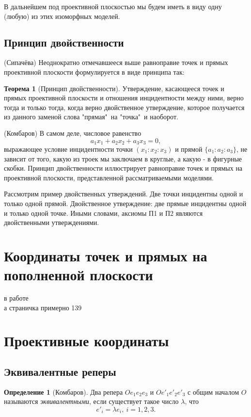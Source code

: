 \documentclass[a4paper, 12pt]{article}
\theoremstyle{definition}
\newtheorem*{definition}{Определение}
\newtheorem*{theorem}{Теорема}
\begin{document}
В дальнейшем под проективной плоскостью мы будем иметь в виду одну (любую) из этих изоморфных моделей.


\subsection{Принцип двойственности}
(Сипачёва) Неоднократно отмечавшееся выше равноправие точек и прямых проективной плоскости формулируется в виде принципа так:

\begin{theorem}[Принцип двойственности]
    Утверждение, касающееся точек и прямых проективной плоскости и отношения инцидентности между ними, верно тогда и только тогда, когда верно двойственное утверждение, которое получается из данного заменой слова "прямая"\ на "точка"\ и наоборот.
\end{theorem}

(Комбаров) В самом деле, числовое равенство \[ a_1x_1 + a_2x_2 + a_3x_3 = 0, \] выражающее условие инцидентности точки $(x_1:x_2:x_3)$ и прямой $\{a_1:a_2:a_3\}$, не зависит от того, какую из троек мы заключаем в круглые, а какую - в фигурные скобки. Принцип двойственности иллюстрирует равноправие точек и прямых на проективной плоскости, представленной рассматриваемыми моделями.

Рассмотрим пример двойственных утверждений. Две точки инцидентны одной и только одной прямой. Двойственное утверждение: две прямые инцидентны одной и только одной точке. Иными словами, аксиомы П1 и П2 являются двойственными утверждениями.

\section{Координаты точек и прямых на пополненной плоскости}
в работе\\
а страничка примерно 139

\section{Проективные координаты}
\subsection{Эквивалентные реперы}
\begin{definition}[Комбаров]
    Два репера $Oe_1e_2e_3$ и $Oe'_1e'_2e'_3$ с общим началом $O$ называются \textit{эквивалентными}, если существует такое число $\lambda$, что \[e'_i = \lambda e_i, \ i = 1,2,3.\]
\end{definition}
\end{document}
